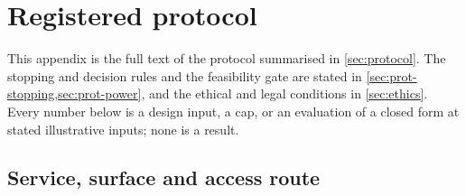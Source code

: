 \providecommand{\Se}{\mathrm{Se}}
\providecommand{\Sp}{\mathrm{Sp}}
\providecommand{\PPV}{\mathrm{PPV}}
\providecommand{\FOR}{\mathrm{FOR}}

\section{Registered protocol}\label{app:protocol}

This appendix is the full text of the protocol summarised in \cref{sec:protocol}. The stopping and decision rules and the feasibility gate are stated in \cref{sec:prot-stopping,sec:prot-power}, and the ethical and legal conditions in \cref{sec:ethics}. Every number below is a design input, a cap, or an evaluation of a closed form at stated illustrative inputs; none is a result.

\subsection{Service, surface and access route}\label{sec:prot-scope}

